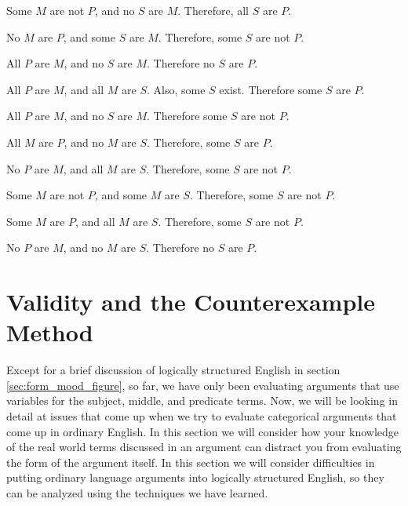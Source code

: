 \begin{exercises} 
 
\item Some $M$ are not $P$, and no $S$ are $M$. Therefore, all $S$ are $P$.
 
\item No $M$ are $P$, and some $S$ are $M$. Therefore, some $S$ are not $P$.
 
\item All $P$ are $M$, and no $S$ are $M$. Therefore no $S$ are $P$. 
 
\item All $P$ are $M$, and all $M$ are $S$. Also, some $S$ exist. Therefore some $S$ are $P$. 
  
\item All $P$ are $M$, and no $S$ are $M$. Therefore some $S$ are not $P$. 
 
\item All $M$ are $P$, and no $M$ are $S$. Therefore, some $S$ are $P$.
 
\item No $P$ are $M$, and all $M$ are $S$. Therefore, some $S$ are not $P$.
 
\item Some $M$ are not $P$, and some $M$ are $S$. Therefore, some $S$ are not $P$.
  
\item Some $M$ are $P$, and all $M$ are $S$. Therefore, some $S$ are not $P$.
 
\item No $P$ are $M$, and no $M$ are $S$. Therefore no $S$ are $P$.
 
\end{exercises}



\section{Validity and the Counterexample Method} 
\label{sec:counterexample}

Except for a brief discussion of logically structured English in section \ref{sec:form_mood_figure}, so far, we have only been evaluating arguments that use variables for the subject, middle, and predicate terms. Now, we will be looking in detail at issues that come up when we try to evaluate categorical arguments that come up in ordinary English. In this section we will consider how your knowledge of the real world terms discussed in an argument can distract you from evaluating the form of the argument itself. In this section we will consider difficulties in putting ordinary language arguments into logically structured English, so they can be analyzed using the techniques we have learned. 

